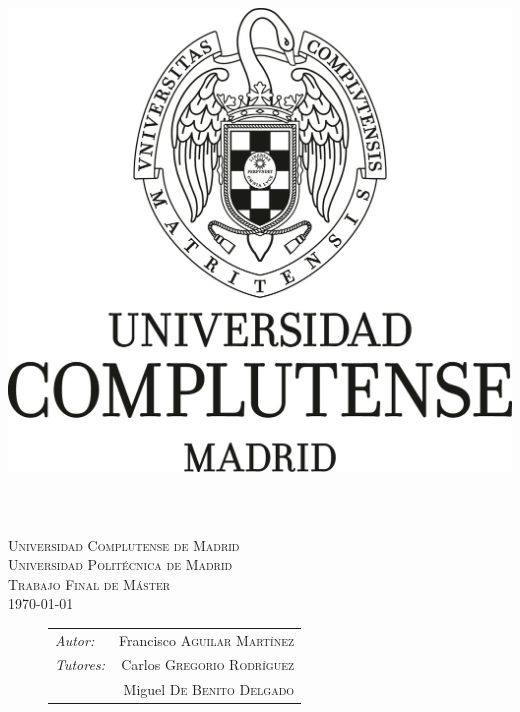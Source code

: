 \begin{titlepage}
\setcounter{page}{3}
\begin{center}
    
    \vfill
    
    \includegraphics[height=0.5\textwidth]{img/escudo_ucm_byn.jpg}\\[1cm]
     
    \HRule \\[0.4cm]
    { \huge \bfseries \ttitle}\\[0.4cm]
    \HRule \\[1.5cm]
    
    \textsc{\LARGE Universidad Complutense de Madrid}\\[0.5cm]
    \textsc{\LARGE Universidad Politécnica de Madrid}\\[0.5cm]
     
    \textsc{\Large Trabajo Final de Máster}\\[0.5cm]
    
    {\large \today}
     
    \vfill
    
    \begin{figure}[!hptb]
    \flushright
        \begin{tabular}{lr}
        \emph{Autor:}    & Francisco \textsc{Aguilar Martínez}\\
        \emph{Tutores:}  & Carlos \textsc{Gregorio Rodríguez}\\
                        & Miguel \textsc{De Benito Delgado}\\
        \end{tabular}
    \end{figure}
	
    \noindent
     
    \vspace{1cm}
\end{center}     
\end{titlepage}
